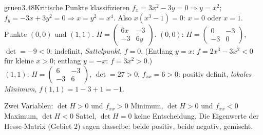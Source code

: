 \begin{loesungkarte}{gruen}{3.48}{Kritische Punkte klassifizieren}
$f_x = 3x^{2} - 3y = 0\Rightarrow y = x^{2}$; $f_y = -3x + 3y^{2} = 0\Rightarrow x = y^{2} = x^{4}$. Also $x(x^{3} - 1) = 0$: $x = 0$ oder $x = 1$. Punkte $(0, 0)$ und $(1, 1)$.
$H = \begin{pmatrix}6x & -3\\ -3 & 6y\end{pmatrix}$.
$(0, 0)$: $H = \begin{pmatrix}0 & -3\\ -3 & 0\end{pmatrix}$, $\det = -9 < 0$: indefinit, \emph{Sattelpunkt}, $f = 0$. (Entlang $y = x$: $f = 2x^{3} - 3x^{2} < 0$ für kleine $x > 0$; entlang $y = -x$: $f = 3x^{2} > 0$.) \\
$(1, 1)$: $H = \begin{pmatrix}6 & -3\\ -3 & 6\end{pmatrix}$, $\det = 27 > 0$, $f_{xx} = 6 > 0$: positiv definit, \emph{lokales Minimum}, $f(1, 1) = 1 - 3 + 1 = -1$.
\begin{mitnehmen}\kastentext
Zwei Variablen: $\det H > 0$ und $f_{xx} > 0$ Minimum, $\det H > 0$ und $f_{xx} < 0$ Maximum, $\det H < 0$ Sattel, $\det H = 0$ keine Entscheidung. Die Eigenwerte der Hesse-Matrix (Gebiet 2) sagen dasselbe: beide positiv, beide negativ, gemischt.
\end{mitnehmen}
\end{loesungkarte}

